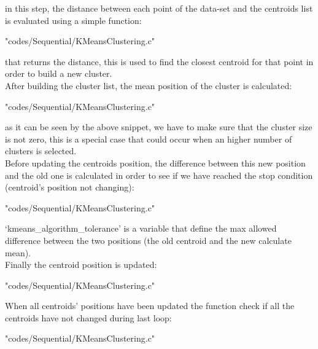 \documentclass[10pt,twocolumn,letterpaper]{article}
\begin{document}
in this step, the distance between each point of the data-set and the centroids list is evaluated using a simple function:\\
\begin{lstinputlisting}[language=C,style=CSnippetStyle,caption=Distance Calculation,firstline=9,lastline=19 ]{
	"codes/Sequential/KMeansClustering.c"}
\end{lstinputlisting}
that returns the distance, this is used to find the closest centroid for that point in order to build a new cluster.\\
After building the cluster list, the mean position of the cluster is calculated:\\
\begin{lstinputlisting}[language=C,style=CSnippetStyle,caption=Distance Calculation,firstline=81,lastline=99 ]{
	"codes/Sequential/KMeansClustering.c"}
\end{lstinputlisting}
as it can be seen by the above snippet, we have to make sure that the cluster size is not zero, this is a special case that could occur
when an higher number of clusters is selected.\\
Before updating the centroids position, the difference between this new position and the old one is calculated in order to see if we 
have reached the stop condition (centroid's position not changing):\\
\begin{lstinputlisting}[language=C,style=CSnippetStyle,caption=Distance Calculation,firstline=100,lastline=108 ]{
	"codes/Sequential/KMeansClustering.c"}
\end{lstinputlisting}
`kmeans\_algorithm\_tolerance' is a variable that define the max allowed difference between the two positions (the old centroid and the
new calculate mean).\\
Finally the centroid position is updated:\\
\begin{lstinputlisting}[language=C,style=CSnippetStyle,caption=Distance Calculation,firstline=109,lastline=109]{
	"codes/Sequential/KMeansClustering.c"}
\end{lstinputlisting}
When all centroids' positions have been updated the function check if all the centroids have not changed during last loop:\\
\begin{lstinputlisting}[language=C,style=CSnippetStyle,caption=Distance Calculation,firstline=111,lastline=113]{
	"codes/Sequential/KMeansClustering.c"}
\end{lstinputlisting}
\end{document}
